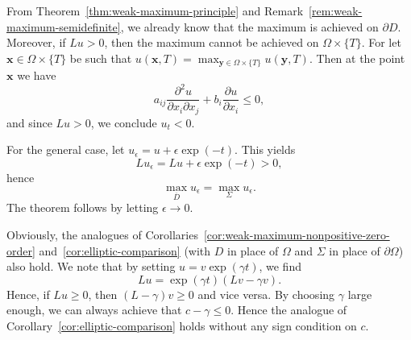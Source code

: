 \begin{Proof}
From Theorem~\ref{thm:weak-maximum-principle} and Remark~\ref{rem:weak-maximum-semidefinite}, we already know that the maximum is achieved on $\partial D$. Moreover, if $Lu>0$, then the maximum cannot be achieved on $\Omega\times\{T\}$. For let $\bm{x}\in\Omega\times\{T\}$ be such that $u(\bm{x},T)=\max_{\bm{y}\in\Omega\times\{T\}}u(\bm{y},T)$. Then at the point $\bm{x}$ we have
\begin{equation}\label{eq:parabolic-top-spatial-maximum-inequality}
a_{ij}\dfrac{\partial^2u}{\partial x_i\partial x_j}+b_i\dfrac{\partial u}{\partial x_i}\leq0,
\end{equation}
and since $Lu>0$, we conclude $u_t<0$.

For the general case, let $u_\epsilon=u+\epsilon\exp(-t)$. This yields
\begin{equation}\label{eq:parabolic-weak-positive-perturbation}
Lu_\epsilon=Lu+\epsilon\exp(-t)>0,
\end{equation}
hence
\begin{equation}\label{eq:parabolic-weak-boundary-maximum}
\max_{\overline D}u_\epsilon=\max_\Sigma u_\epsilon.
\end{equation}
The theorem follows by letting $\epsilon\to0$.
\end{Proof}

Obviously, the analogues of Corollaries~\ref{cor:weak-maximum-nonpositive-zero-order} and~\ref{cor:elliptic-comparison} (with $D$ in place of $\Omega$ and $\Sigma$ in place of $\partial\Omega$) also hold. We note that by setting $u=v\exp(\gamma t)$, we find
\begin{equation}\label{eq:parabolic-zero-order-exponential-shift}
Lu=\exp(\gamma t)(Lv-\gamma v).
\end{equation}
Hence, if $Lu\geq0$, then $(L-\gamma)v\geq0$ and vice versa. By choosing $\gamma$ large enough, we can always achieve that $c-\gamma\leq0$. Hence the analogue of Corollary~\ref{cor:elliptic-comparison} holds without any sign condition on $c$.

